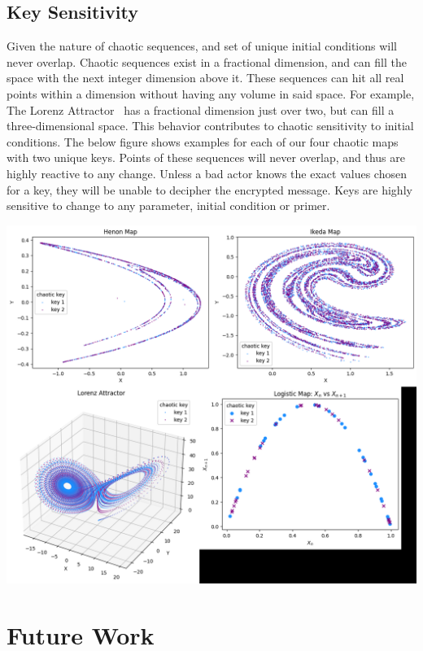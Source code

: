 \documentclass[conference]{IEEEtran}
\begin{document}
\subsection{Key Sensitivity}\label{subsec:key-sensitivity}

Given the nature of chaotic sequences, and set of unique initial conditions will never overlap.
Chaotic sequences exist in a fractional dimension, and can fill the space with the next integer dimension above it.
These sequences can hit all real points within a dimension without having any volume in said space.
For example, The Lorenz Attractor~\cite{Alligood} has a fractional dimension just over two, but can fill a three-dimensional space.
This behavior contributes to chaotic sensitivity to initial conditions.
The below figure shows examples for each of our four chaotic maps with two unique keys.
Points of these sequences will never overlap, and thus are highly reactive to any change.
Unless a bad actor knows the exact values chosen for a key, they will be unable to decipher the encrypted message.
Keys are highly sensitive to change to any parameter, initial condition or primer.

\begin{center}
    \includegraphics[scale=.2]{images/KeySen}
\end{center}


\section{Future Work}\label{sec:future-work}
\end{document}
